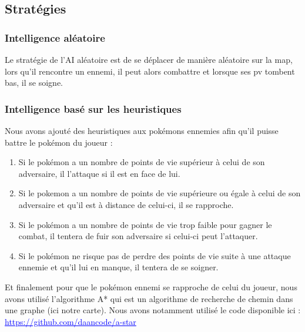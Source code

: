 \documentclass[a4paper,12pt]{article}
\begin{document}
    \subsection{Stratégies}
    \subsubsection{Intelligence aléatoire}
    
    Le stratégie de l'AI aléatoire est de se déplacer de manière aléatoire sur la map, lors qu'il rencontre un ennemi, il peut alors combattre et lorsque ses pv tombent bas, il se soigne.
    
    \subsubsection{Intelligence basé sur les heuristiques}
    
    Nous avons ajouté des heuristiques aux pokémons ennemies afin qu'il puisse battre le pokémon du joueur :\begin{enumerate}
        \item Si le pokémon a un nombre de points de vie supérieur à celui de son adversaire, il l'attaque si il est en face de lui. 
\item Si le pokemon a un nombre de points de vie supérieure ou égale à celui de son adversaire et qu'il est à distance de celui-ci, il se rapproche.
        \item Si le pokémon a un nombre de points de vie trop faible pour gagner le combat, il tentera de fuir son adversaire si celui-ci peut l'attaquer.
         \item Si le pokémon ne risque pas de perdre des points de vie suite à une attaque ennemie et qu'il lui en manque, il tentera de se soigner.
    \end{enumerate}
    Et finalement pour que le pokémon ennemi se rapproche de celui du joueur, nous avons utilisé l'algorithme A* qui est un algorithme de recherche de chemin dans une graphe (ici notre carte).
    Nous avons notamment utilisé le code disponible ici : \textcolor{blue}{\underline{ https://github.com/daancode/a-star}}
    
\end{document}

